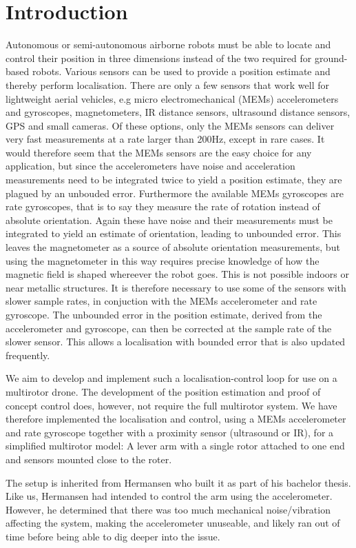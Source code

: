 \section{Introduction}
Autonomous or semi-autonomous airborne robots must be able to locate and control their position in three dimensions instead of
the two required for ground-based robots. Various sensors can be used to provide a position estimate and thereby perform localisation.
There are only a few sensors that work well for lightweight aerial vehicles, e.g
micro electromechanical (MEMs) accelerometers and gyroscopes, magnetometers, IR
distance sensors, ultrasound distance sensors, GPS and small cameras. Of these options, only the MEMs sensors can deliver very fast measurements
at a rate larger than 200Hz, except in rare cases. It would therefore seem that the MEMs
sensors are the easy choice for any application, but since the accelerometers have noise and acceleration measurements need to be 
integrated twice to yield a position estimate, they are plagued by an unbouded error. Furthermore the available MEMs gyroscopes are rate 
gyroscopes, that is to say they measure the rate of rotation instead of absolute orientation. Again these have noise and their measurements
must be integrated to yield an estimate of orientation, leading to unbounded error. This leaves the magnetometer as a source of
absolute orientation measurements, but using the magnetometer in this way requires precise knowledge of how the magnetic field is 
shaped whereever the robot goes. This is not possible indoors or near metallic structures.
It is therefore necessary to use some of the sensors with slower sample rates, in conjuction with
the MEMs accelerometer and rate gyroscope. The unbounded error in the position estimate, derived from the accelerometer and gyroscope,
can then be corrected at the sample rate of the slower sensor. This allows a localisation with bounded error that is also updated
frequently. 

We aim to develop and implement such a localisation-control loop for use on a
multirotor drone. The development of the position estimation and proof of
concept control does, however, not require the full multirotor system.
We have therefore implemented the localisation 
and control, using a MEMs accelerometer and rate gyroscope together with a proximity sensor (ultrasound or IR), for a simplified multirotor model: 
A lever arm with a single rotor attached to one end and sensors mounted close to the roter.

The setup is inherited from Hermansen who built it as part of his bachelor thesis\cite{Hermansen2013a}.
Like us, Hermansen had intended to control the arm using the accelerometer. However, he determined that there was too much mechanical 
noise/vibration affecting the system, making the accelerometer unuseable, and
likely ran out of time before being able to dig deeper into the issue.

